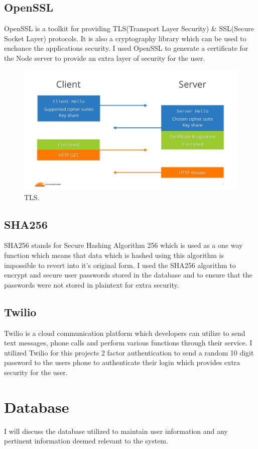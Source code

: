 \subsection{OpenSSL}
OpenSSL is a toolkit for providing TLS(Transport Layer Security) \& SSL(Secure Socket Layer) protocols.  It is also a cryptography library which can be used to enchance the applications security.  I used OpenSSL to generate a certificate for the Node server to provide an extra layer of security for the user.
\\
\begin{figure}[H]
  \includegraphics[width=\textwidth]{img/tls.png}
  \caption{TLS.}
  \label{fig: How TLS Works}
\end{figure}
\cite{TLS}
\subsection{SHA256}
SHA256 stands for Secure Hashing Algorithm 256 which is used as a one way function which means that data which is hashed using this algorithm is impossible to revert into it's original form\cite{SHA256}.  I used the SHA256 algorithm to encrypt and secure user passwords stored in the database and to ensure that the passwords were not stored in plaintext for extra security.
\subsection{Twilio}
Twilio is a cloud communication platform which developers can utilize to send text messages, phone calls and perform various functions through their service\cite{Twilio}. I utilized Twilio for this projects 2 factor authentication to send a random 10 digit password to the users phone to authenticate their login which provides extra security for the user.
\section{Database}
I will discuss the database utilized to maintain user information and any pertinent information deemed relevant to the system.
